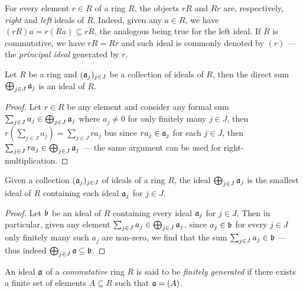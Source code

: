 \begin{example}
\label{exp:ideal-out-of-an-element}
For every element \(r \in R\) of a ring \(R\), the objects \(r R\) and \(R r\)
are, respectively, \emph{right} and \emph{left} ideals of \(R\). Indeed, given
any \(a \in R\), we have \((r R) a = r (R a) \subseteq r R\), the analogous
being true for the left ideal. If \(R\) is commutative, we have \(r R = R r\)
and such ideal is commonly denoted by \((r)\) --- the \emph{principal ideal}
generated by \(r\).
\end{example}

\begin{proposition}
\label{prop:direct-sum-of-ideals-is-ideal}
Let \(R\) be a ring and \((\mathfrak{a}_j)_{j \in J}\) be a collection of ideals of
\(R\), then the direct sum \(\bigoplus_{j \in J} \mathfrak{a}_j\) is an ideal of
\(R\).
\end{proposition}

\begin{proof}
Let \(r \in R\) be any element and consider any formal sum
\(\sum_{j \in J} a_j \in \bigoplus_{j \in J} \mathfrak{a}_j\) where \(a_j \neq 0\)
for only finitely many \(j \in J\), then
\(r (\sum_{j \in J} a_j) = \sum_{j \in J} r a_j\) bus since
\(r a_j \in \mathfrak{a}_j\) for each \(j \in J\), then
\(\sum_{j \in J} r a_j \in \bigoplus_{j \in J} \mathfrak{a}_j\) --- the same
argument can be used for right-multiplication.
\end{proof}

\begin{lemma}
\label{lem:direct-sum-smallest-ideal}
Given a collection \((\mathfrak{a}_j)_{j \in J}\) of ideals of a ring \(R\), the
ideal \(\bigoplus_{j \in J} \mathfrak{a}_j\) is the smallest ideal of \(R\)
containing each ideal \(\mathfrak{a}_j\) for \(j \in J\).
\end{lemma}

\begin{proof}
Let \(\mathfrak{b}\) be an ideal of \(R\) containing every ideal \(\mathfrak{a}_j\)
for \(j \in J\). Then in particular, given any element
\(\sum_{j \in J} a_j \in \bigoplus_{j \in J} \mathfrak{a}_j\), since
\(a_j \in \mathfrak{b}\) for every \(j \in J\) only finitely many such \(a_j\) are
non-zero, we find that the sum \(\sum_{j \in J} a_j \in \mathfrak{b}\) --- thus
indeed \(\bigoplus_{j \in J} \mathfrak{a} \subseteq \mathfrak{b}\).
\end{proof}

\begin{definition}
\label{def:finitely-generated-ideal}
An ideal \(\mathfrak{a}\) of a \emph{commutative} ring \(R\) is said to be
\emph{finitely generated} if there exists a finite set of elements
\(A \subseteq R\) such that \(\mathfrak{a} = (A)\).
\end{definition}

